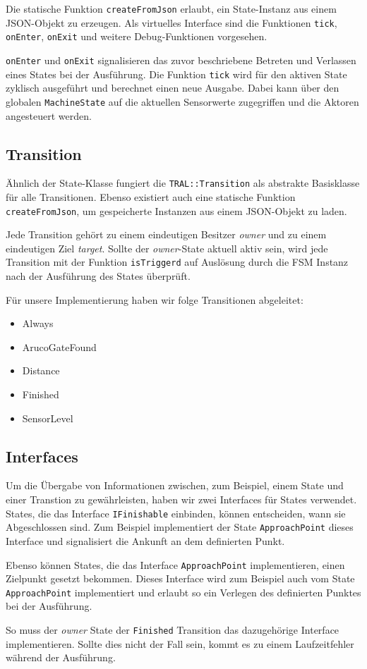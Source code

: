 Die statische Funktion \texttt{createFromJson} erlaubt, ein State-Instanz aus einem JSON-Objekt zu erzeugen. Als virtuelles Interface sind die Funktionen \texttt{tick}, \texttt{onEnter}, \texttt{onExit} und weitere Debug-Funktionen vorgesehen.

\texttt{onEnter} und \texttt{onExit} signalisieren das zuvor beschriebene Betreten und Verlassen eines States bei der Ausführung. Die Funktion \texttt{tick} wird für den aktiven State zyklisch ausgeführt und berechnet einen neue Ausgabe. Dabei kann über den globalen \texttt{MachineState} auf die aktuellen Sensorwerte zugegriffen und die Aktoren angesteuert werden.


\subsection{Transition}
Ähnlich der State-Klasse fungiert die \texttt{TRAL::Transition} als abstrakte Basisklasse für alle Transitionen. Ebenso existiert auch eine statische Funktion \texttt{createFromJson}, um gespeicherte Instanzen aus einem JSON-Objekt zu laden. 

Jede Transition gehört zu einem eindeutigen Besitzer \textit{owner} und zu einem eindeutigen Ziel \textit{target}. Sollte der \textit{owner}-State aktuell aktiv sein, wird jede Transition mit der Funktion \texttt{isTriggerd} auf Auslösung durch die FSM Instanz nach der Ausführung des States überprüft.

Für unsere Implementierung haben wir folge Transitionen abgeleitet:

\begin{itemize}
	\item Always
	\item ArucoGateFound
	\item Distance
	\item Finished
	\item SensorLevel
\end{itemize}

\subsection{Interfaces}

Um die Übergabe von Informationen zwischen, zum Beispiel, einem State und einer Transtion zu gewährleisten, haben wir zwei Interfaces für States verwendet. 
States, die das Interface \texttt{IFinishable} einbinden, können entscheiden, wann sie Abgeschlossen sind. Zum Beispiel implementiert der State \texttt{ApproachPoint} dieses Interface und signalisiert die Ankunft an dem definierten Punkt.

Ebenso können States, die das Interface \texttt{ApproachPoint} implementieren, einen Zielpunkt gesetzt bekommen. Dieses Interface wird zum Beispiel auch vom State \texttt{ApproachPoint} implementiert und erlaubt so ein Verlegen des definierten Punktes bei der Ausführung.

So muss der \textit{owner} State der \texttt{Finished} Transition das dazugehörige Interface implementieren. Sollte dies nicht der Fall sein, kommt es zu einem Laufzeitfehler während der Ausführung.
